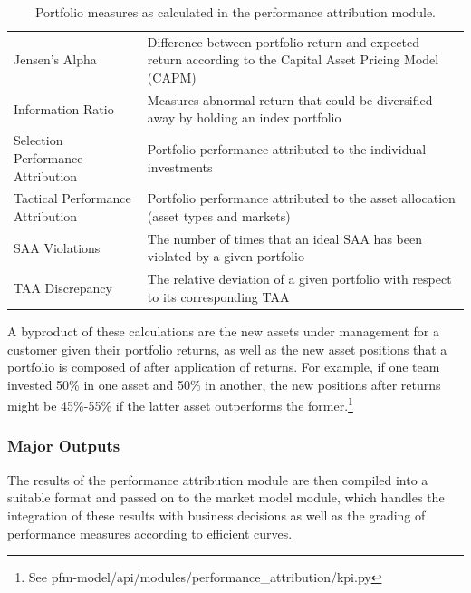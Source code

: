 \begin{table}[h!]
\begin{tabular}{lp{8cm}}
        Jensen's Alpha                    & Difference between portfolio return and expected return according to the Capital Asset Pricing Model (CAPM) \\
        Information Ratio                 & Measures abnormal return that could be diversified away by holding an index portfolio                       \\
        Selection Performance Attribution & Portfolio performance attributed to the individual investments                                              \\
        Tactical Performance Attribution  & Portfolio performance attributed to the asset allocation (asset types and markets)                          \\
        SAA Violations                    & The number of times that an ideal SAA has been violated by a given portfolio                                \\
        TAA Discrepancy                   & The relative deviation of a given portfolio with respect to its corresponding TAA                           \\
        \bottomrule
    \end{tabular}
    \centering
    \caption{Portfolio measures as calculated in the performance attribution module.}
    \label{table:portfolio_measures}
\end{table}

A byproduct of these calculations are the new assets under management for a customer given their portfolio returns, as well as the new asset positions that a portfolio is composed of after application of returns. For example, if one team invested 50\% in one asset and 50\% in another, the new positions after returns might be 45\%-55\% if the latter asset outperforms the former.\footnote{See pfm-model/api/modules/performance\_attribution/kpi.py}

\subsubsection{Major Outputs}
The results of the performance attribution module are then compiled into a suitable format and passed on to the market model module, which handles the integration of these results with business decisions as well as the grading of performance measures according to efficient curves.


